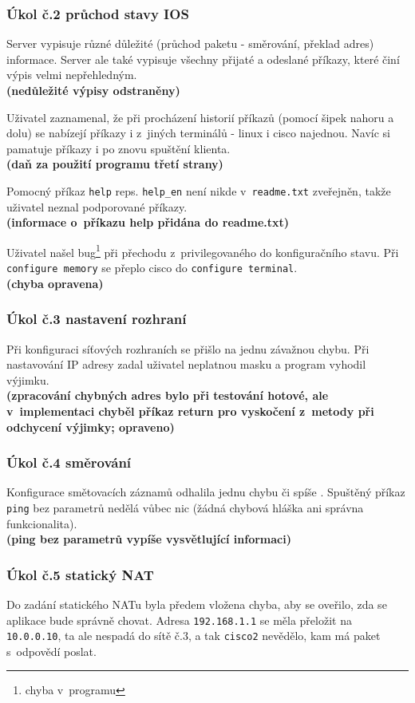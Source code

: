 \subsubsection{Úkol č.2 průchod stavy IOS}
Server vypisuje různé důležité (průchod paketu - směrování, překlad adres) informace. Server ale také vypisuje všechny přijaté a odeslané příkazy, které činí výpis velmi nepřehledným.
\\\textbf{(nedůležité výpisy odstraněny)}

Uživatel zaznamenal, že při procházení historií příkazů (pomocí šipek nahoru a dolu) se nabízejí příkazy i z~jiných terminálů - linux i cisco najednou. Navíc si pamatuje příkazy i po znovu spuštění klienta.
\\\textbf{(daň za použití programu třetí strany)}

Pomocný příkaz \verb|help| reps. \verb|help_en| není nikde v~\verb|readme.txt| zveřejněn, takže uživatel neznal podporované příkazy.
\\\textbf{(informace o~příkazu help přidána do readme.txt)}

Uživatel našel bug\footnote{chyba v~programu} při přechodu z~privilegovaného do konfiguračního stavu. Při \\\verb|configure memory| se přeplo cisco do \verb|configure terminal|.
\\\textbf{(chyba opravena)}

\subsubsection{Úkol č.3 nastavení rozhraní}
Při konfiguraci síťových rozhraních se přišlo na jednu závažnou chybu. Při nastavování IP adresy zadal uživatel neplatnou masku a program vyhodil výjimku.
\\\textbf{(zpracování chybných adres bylo při testování hotové, ale v~implementaci chyběl příkaz return pro vyskočení z~metody při odchycení výjimky; opraveno)}

\subsubsection{Úkol č.4 směrování}
Konfigurace smětovacích záznamů odhalila jednu chybu či spíše . Spuštěný příkaz \verb|ping| bez parametrů nedělá vůbec nic (žádná chybová hláška ani správna funkcionalita).
\\\textbf{(ping bez parametrů vypíše vysvětlující informaci)}

\subsubsection{Úkol č.5 statický NAT}
Do zadání statického NATu byla předem vložena chyba, aby se oveřilo, zda se aplikace bude správně chovat. Adresa \verb|192.168.1.1| se měla přeložit na \verb|10.0.0.10|, ta ale nespadá do sítě č.3, a tak \verb|cisco2| nevědělo, kam má paket s~odpovědí poslat.

